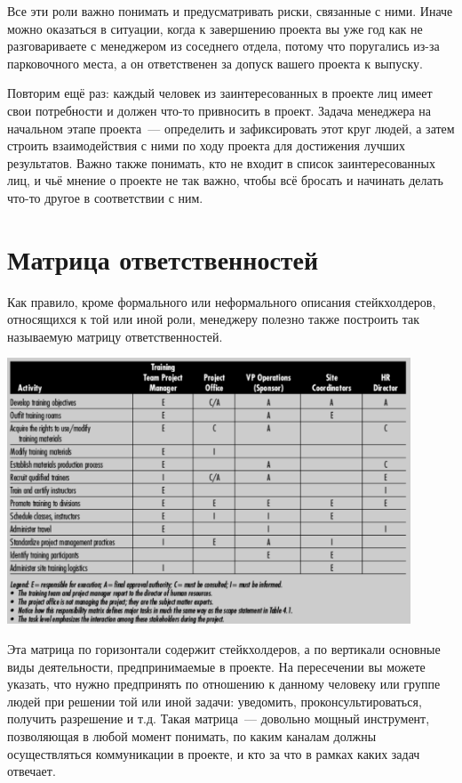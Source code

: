 \documentclass{../../text-style}
\begin{document}
Все эти роли важно понимать и предусматривать риски, связанные с ними. Иначе можно оказаться в ситуации, когда к завершению проекта вы уже год как не разговариваете с менеджером из соседнего отдела, потому что поругались из-за парковочного места, а он ответственен за допуск вашего проекта к выпуску.

Повторим ещё раз: каждый человек из заинтересованных в проекте лиц имеет свои потребности и должен что-то привносить в проект. Задача менеджера на начальном этапе проекта~--- определить и зафиксировать этот круг людей, а затем строить взаимодействия с ними по ходу проекта для достижения лучших результатов. Важно также понимать, кто не входит в список заинтересованных лиц, и чьё мнение о проекте не так важно, чтобы всё бросать и начинать делать что-то другое в соответствии с ним.

\section{Матрица ответственностей}

Как правило, кроме формального или неформального описания стейкхолдеров, относящихся к той или иной роли, менеджеру полезно также построить так называемую матрицу ответственностей.

\begin{center}
    \includegraphics[width=0.9\textwidth]{stakeholders.png}
\end{center}

Эта матрица по горизонтали содержит стейкхолдеров, а по вертикали основные виды деятельности, предпринимаемые в проекте. На пересечении вы можете указать, что нужно предпринять по отношению к данному человеку или группе людей при решении той или иной задачи: уведомить, проконсультироваться, получить разрешение и т.д. Такая матрица~--- довольно мощный инструмент, позволяющая в любой момент понимать, по каким каналам должны осуществляться коммуникации в проекте, и кто за что в рамках каких задач отвечает.
\end{document}
